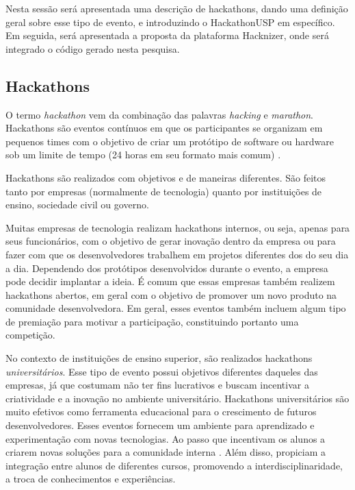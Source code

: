 \documentclass[10pt,twoside,a4paper]{article}
\begin{document}
  Nesta sessão será apresentada uma descrição de hackathons, dando uma definição geral sobre esse tipo de evento, e introduzindo o HackathonUSP em específico. Em seguida, será apresentada a proposta da plataforma Hacknizer, onde será integrado o código gerado nesta pesquisa.

  \subsection{Hackathons}
  
    O termo \textit{hackathon} vem da combinação das palavras \textit{hacking} e \textit{marathon}. Hackathons são eventos contínuos em que os participantes se organizam em pequenos times com o objetivo de criar um protótipo de software ou hardware sob um limite de tempo (24 horas em seu formato mais comum) \cite{Komssi2015WhatFor}.
    
    Hackathons são realizados com objetivos e de maneiras diferentes. São feitos tanto por empresas (normalmente de tecnologia) quanto por instituições de ensino, sociedade civil ou governo.
    
    Muitas empresas de tecnologia realizam hackathons internos, ou seja, apenas para seus funcionários, com o objetivo de gerar inovação dentro da empresa ou para fazer com que os desenvolvedores trabalhem em projetos diferentes dos do seu dia a dia. Dependendo dos protótipos desenvolvidos durante o evento, a empresa pode decidir implantar a ideia. É comum que essas empresas também realizem hackathons abertos, em geral com o objetivo de promover um novo produto na comunidade desenvolvedora. Em geral, esses eventos também incluem algum tipo de premiação para motivar a participação, constituindo portanto uma competição.
    
    No contexto de instituições de ensino superior, são realizados hackathons \textit{universitários}. Esse tipo de evento possui objetivos diferentes daqueles das empresas, já que costumam não ter fins lucrativos e buscam incentivar a criatividade e a inovação no ambiente universitário. Hackathons universitários são muito efetivos como ferramenta educacional para o crescimento de futuros desenvolvedores. Esses eventos fornecem um ambiente para aprendizado e experimentação com novas tecnologias. Ao passo que incentivam os alunos a criarem novas soluções para a comunidade interna \cite{Kayastha2017EnablingCompetition}. Além disso, propiciam a integração entre alunos de diferentes cursos, promovendo a interdisciplinaridade, a troca de conhecimentos e experiências.
\end{document}
